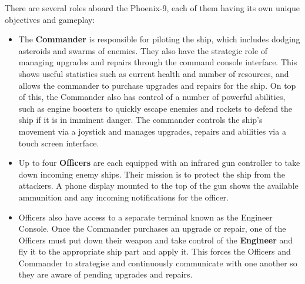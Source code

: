 \documentclass[a4paper,11pt]{article}
\begin{document}
There are several roles aboard the Phoenix-9, each of them having its own unique objectives and gameplay:

\begin{itemize}[noitemsep,topsep=.5ex]
  \item The \textbf{Commander} is responsible for piloting the ship, which includes dodging asteroids and swarms of enemies. They also have the strategic role of managing upgrades and repairs through the command console interface. This shows useful statistics such as current health and number of resources, and allows the commander to purchase upgrades and repairs for the ship. On top of this, the Commander also has control of a number of powerful abilities, such as engine boosters to quickly escape enemies and rockets to defend the ship if it is in imminent danger. 
  The commander controls the ship's movement via a joystick and manages upgrades, repairs and abilities via a touch screen interface. 

  \item Up to four \textbf{Officers} are each equipped with an infrared gun controller to take down incoming enemy ships. Their mission is to protect the ship from the attackers. A phone display mounted to the top of the gun shows the available ammunition and any incoming notifications for the officer.

  \item Officers also have access to a separate terminal known as the Engineer Console. Once the Commander purchases an upgrade or repair, one of the Officers must put down their weapon and take control of the \textbf{Engineer} and fly it to the appropriate ship part and apply it. This forces the Officers and Commander to strategise and continuously communicate with one another so they are aware of pending upgrades and repairs.
\end{itemize}
\end{document}
